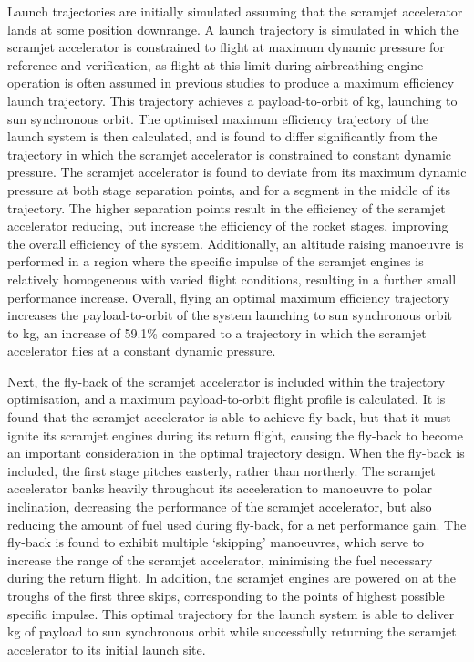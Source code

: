  
Launch trajectories are initially simulated assuming that the scramjet accelerator lands at some position downrange. A launch trajectory is simulated in which the scramjet accelerator is constrained to flight at maximum dynamic pressure for reference and verification, as flight at this limit during airbreathing engine operation is often assumed in previous studies to produce a maximum efficiency launch trajectory. This trajectory achieves a payload-to-orbit of \PayloadToOrbitConstqNoReturn kg, launching to sun synchronous orbit.  
The optimised maximum efficiency trajectory of the launch system is then calculated, and is found to differ significantly from the trajectory in which the scramjet accelerator is constrained to constant dynamic pressure. 
 The scramjet accelerator is found to deviate from its maximum dynamic pressure at both stage separation points, and for a segment in the middle of its trajectory.
 The higher separation points result in the efficiency of the scramjet accelerator reducing, but increase the efficiency of the rocket stages, improving the overall efficiency of the system. 
  Additionally, an altitude raising manoeuvre is performed in a region where the specific impulse of the scramjet engines is relatively homogeneous with varied flight conditions, resulting in a further small performance increase. Overall, flying an optimal maximum efficiency trajectory increases the payload-to-orbit of the system launching to sun synchronous orbit to \PayloadToOrbitStandardNoReturn kg, an increase of 59.1\% compared to a trajectory in which the scramjet accelerator flies at a constant dynamic pressure.  
 
 
 Next, the fly-back of the scramjet accelerator is included within the trajectory optimisation, and a maximum payload-to-orbit flight profile is calculated. 
 It is found that the scramjet accelerator is able to achieve fly-back, but that it must ignite its scramjet engines during its return flight, causing the fly-back to become an important consideration in the optimal trajectory design. When the fly-back is included, the first stage pitches easterly, rather than northerly. The scramjet accelerator banks heavily throughout its acceleration to manoeuvre to polar inclination, decreasing the performance of the scramjet accelerator, but also reducing the amount of fuel used during fly-back, for a net performance gain. 
The fly-back is found to exhibit multiple `skipping' manoeuvres, which serve to increase the range of the scramjet accelerator, minimising the fuel necessary during the return flight. In addition, the scramjet engines are powered on at the troughs of the first three skips, corresponding to the points of highest possible specific impulse. This optimal trajectory for the launch system is able to deliver \PayloadToOrbitStandard kg of payload to sun synchronous orbit while successfully returning the scramjet accelerator to its initial launch site.  

